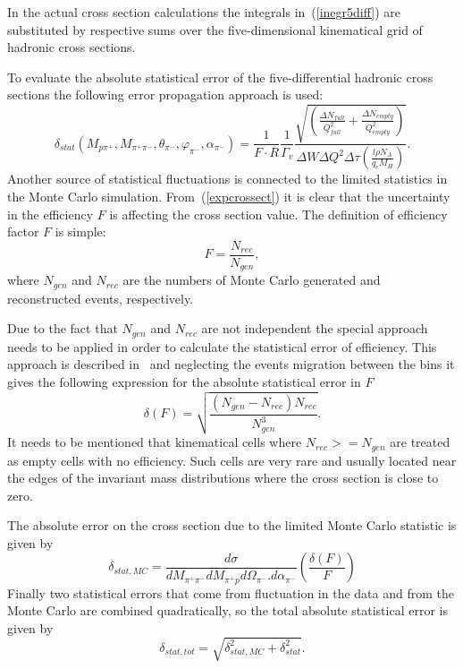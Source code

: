 In the actual cross section calculations the
integrals in~(\ref{inegr5diff}) are
substituted by respective sums over the
five-dimensional kinematical grid of hadronic
cross sections. 


To evaluate 
the absolute statistical error of the five-differential
 hadronic cross sections the following error
 propagation approach is used:
 \begin{equation}
\delta_{stat}(M_{p\pi^{+}},M_{\pi^{+}\pi^{-}},\theta_{\pi^{-}},\varphi_{\pi^{-}},
\alpha_{\pi^{-}}) = \frac{1}{F \cdot R} 
\frac{1}{ \Gamma_{v} }
\frac{\sqrt{\left( \frac{\Delta
N_{full}}{Q_{full}^{2}}+\frac{\Delta N_{empty}}{Q_{empty}^{2}} \right) } }{
\Delta W \Delta Q^{2} \Delta \tau \left( \frac{l \rho N_{A}}{q_{e}M_{H}} \right)}.
\label{staterrors}
\end{equation}
Another source of statistical fluctuations is connected to the limited statistics in the
Monte Carlo simulation. From~(\ref{expcrossect}) it is clear that the uncertainty in the
 efficiency $F$ is affecting the cross section value.
The definition of efficiency factor $F$ is simple:
\begin{equation}
F = \frac{N_{rec}}{N_{gen}},
\label{efficiency}
\end{equation}
where $N_{gen}$ and $N_{rec}$ are the numbers of Monte Carlo generated and reconstructed events, respectively.

Due to the fact that $N_{gen}$ and $N_{rec}$ are not independent the special approach needs to be applied in order to calculate the statistical error of efficiency. This approach is described in~\cite{Laforge:1996ts} and neglecting the events migration between the bins it gives the following expression for  
 the absolute statistical error in $F$
\begin{equation}
\delta(F) =
\sqrt{\frac{(N_{gen}-N_{rec})N_{rec}}{N_{gen}^{3}}}.
\label{efferror}
\end{equation}
It needs to be mentioned that kinematical cells where $N_{rec} >= N_{gen}$ are treated as empty cells with no efficiency. Such cells are very rare and usually located near the edges of the invariant mass distributions where the cross section is close to zero.

The absolute error on the cross section due to the limited Monte Carlo statistic is given by
\begin{equation}
\delta_{stat,MC} = \frac{d\sigma}{dM_{\pi^{+}\pi^{-}}dM_{\pi^{+}p}d\Omega_{\pi^{-}}.
d\alpha_{\pi^{-}}} \left( \frac{\delta(F)}{F} \right)
\label{montecarloerror}
\end{equation}
Finally two statistical errors that come from
fluctuation in the data and from the Monte Carlo are combined quadratically, so the total absolute statistical error is given by
\begin{equation}
\delta_{stat,tot} =
\sqrt{\delta_{stat,MC}^{2} +
\delta_{stat}^{2}}.
\label{errortot}
\end{equation}

